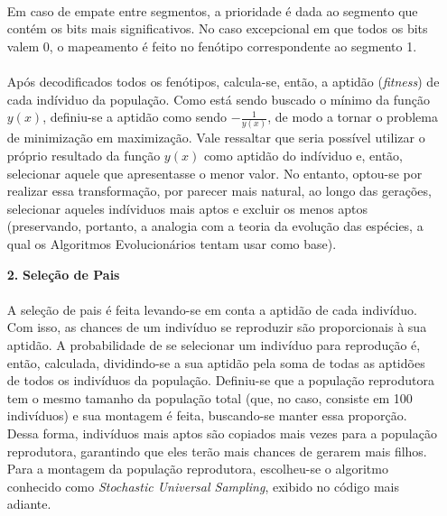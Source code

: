 \documentclass{report}
\begin{document}
\begin{itemize}
		\paragraph{} Em caso de empate entre segmentos, a prioridade é dada ao segmento que contém os bits mais significativos. No caso excepcional em que todos os bits valem 0, o mapeamento é feito no fenótipo correspondente ao segmento 1.\\
		
		\paragraph{} Após decodificados todos os fenótipos, calcula-se, então, a aptidão (\emph{fitness}) de cada indíviduo da população. Como está sendo buscado o mínimo da função $y(x)$, definiu-se a aptidão como sendo $-\frac{1}{y(x)}$, de modo a tornar o problema de minimização em maximização. Vale ressaltar que seria possível utilizar o próprio resultado da função $y(x)$ como aptidão do indíviduo e, então, selecionar aquele que apresentasse o menor valor. No entanto, optou-se por realizar essa transformação, por parecer mais natural, ao longo das gerações, selecionar aqueles indíviduos mais aptos e excluir os menos aptos (preservando, portanto, a analogia com a teoria da evolução das espécies, a qual os Algoritmos Evolucionários tentam usar como base).\\
		
		\item[\textbf{2.}] \textbf{Seleção de Pais}
				
		\paragraph{} A seleção de pais é feita levando-se em conta a aptidão de cada indivíduo. Com isso, as chances de um indivíduo se reproduzir são proporcionais à sua aptidão. A probabilidade de se selecionar um indivíduo para reprodução é, então, calculada, dividindo-se a sua aptidão pela soma de todas as aptidões de todos os indivíduos da população. Definiu-se que a população reprodutora tem o mesmo tamanho da população total (que, no caso, consiste em 100 indivíduos) e sua montagem é feita, buscando-se manter essa proporção. Dessa forma, indivíduos mais aptos são copiados mais vezes para a população reprodutora, garantindo que eles terão mais chances de gerarem mais filhos. Para a montagem da população reprodutora, escolheu-se o algoritmo conhecido como \emph{Stochastic Universal Sampling}, exibido no código mais adiante.\\
		

\end{itemize}
\end{document}
